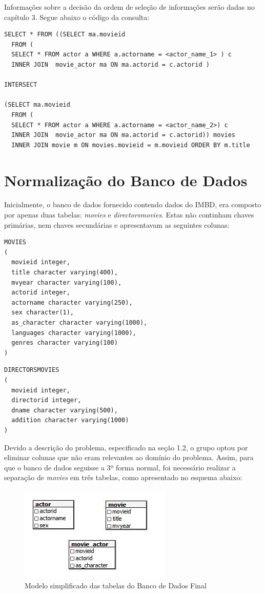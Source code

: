 \documentclass[
	12pt,				%
	oneside,			%
	a4paper,			%
	brazil				%
	]{abntex2}
\begin{document}
Informações sobre a decisão da ordem de seleção de informações serão dadas no capítulo 3. Segue abaixo o código da consulta:
\\
\begin{lstlisting}
SELECT * FROM ((SELECT ma.movieid
  FROM (
  SELECT * FROM actor a WHERE a.actorname = <actor_name_1> ) c
  INNER JOIN  movie_actor ma ON ma.actorid = c.actorid ) 
    
INTERSECT 

(SELECT ma.movieid
  FROM (
  SELECT * FROM actor a WHERE a.actorname = <actor_name_2>) c
  INNER JOIN  movie_actor ma ON ma.actorid = c.actorid)) movies 
  INNER JOIN movie m ON movies.movieid = m.movieid ORDER BY m.title

\end{lstlisting}


\chapter{Normalização do Banco de Dados}

Inicialmente, o banco de dados fornecido contendo dados do IMBD, era composto por apenas duas tabelas: \textit{movies} e \textit{directorsmovies}. Estas não continham chaves primárias, nem chaves secundárias e apresentavam as seguintes colunas: 

\begin{lstlisting}
MOVIES
(
  movieid integer,
  title character varying(400),
  mvyear character varying(100),
  actorid integer,
  actorname character varying(250),
  sex character(1),
  as_character character varying(1000),
  languages character varying(1000),
  genres character varying(100)
)
\end{lstlisting}

\begin{lstlisting}
DIRECTORSMOVIES
(
  movieid integer,
  directorid integer,
  dname character varying(500),
  addition character varying(1000)
)
\end{lstlisting}

Devido a descrição do problema, especificado na seção 1.2, o grupo optou por eliminar colunas que não eram relevantes ao domínio do problema. Assim, para que o banco de dados seguisse a 3º forma normal, foi necessário realizar a separação de \textit{movies} em três tabelas, como apresentado no esquema abaixo:
\newpage

\begin{figure}
\centering
\includegraphics{modeloBanco.jpg}
\caption{Modelo simplificado das tabelas do Banco de Dados Final}

\end{figure}
\end{document}
